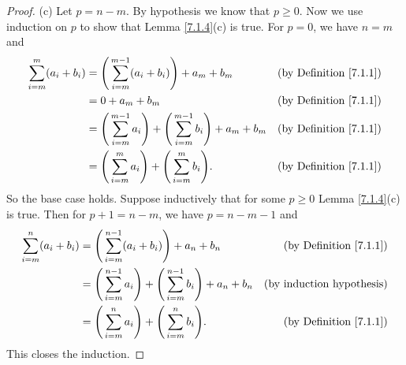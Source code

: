\begin{proof}{(c)}
    Let \(p = n - m\).
    By hypothesis we know that \(p \geq 0\).
    Now we use induction on \(p\) to show that Lemma \ref{7.1.4}(c) is true.
    For \(p = 0\), we have \(n = m\) and
    \begin{align*}
        \sum_{i = m}^m (a_i + b_i) & = \Bigg(\sum_{i = m}^{m - 1} (a_i + b_i)\Bigg) + a_m + b_m                                & \text{(by Definition \ref{7.1.1})} \\
                                   & = 0 + a_m + b_m                                                                           & \text{(by Definition \ref{7.1.1})} \\
                                   & = \Bigg(\sum_{i = m}^{m - 1} a_i\Bigg) + \Bigg(\sum_{i = m}^{m - 1} b_i\Bigg) + a_m + b_m & \text{(by Definition \ref{7.1.1})} \\
                                   & = \Bigg(\sum_{i = m}^m a_i\Bigg) + \Bigg(\sum_{i = m}^m b_i\Bigg).                        & \text{(by Definition \ref{7.1.1})}
    \end{align*}
    So the base case holds.
    Suppose inductively that for some \(p \geq 0\) Lemma \ref{7.1.4}(c) is true.
    Then for \(p + 1 = n - m\), we have \(p = n - m - 1\) and
    \begin{align*}
        \sum_{i = m}^n (a_i + b_i) & = \Bigg(\sum_{i = m}^{n - 1} (a_i + b_i)\Bigg) + a_n + b_n                                & \text{(by Definition \ref{7.1.1})} \\
                                   & = \Bigg(\sum_{i = m}^{n - 1} a_i\Bigg) + \Bigg(\sum_{i = m}^{n - 1} b_i\Bigg) + a_n + b_n & \text{(by induction hypothesis)}   \\
                                   & = \Bigg(\sum_{i = m}^n a_i\Bigg) + \Bigg(\sum_{i = m}^n b_i\Bigg).                        & \text{(by Definition \ref{7.1.1})}
    \end{align*}
    This closes the induction.
\end{proof}

